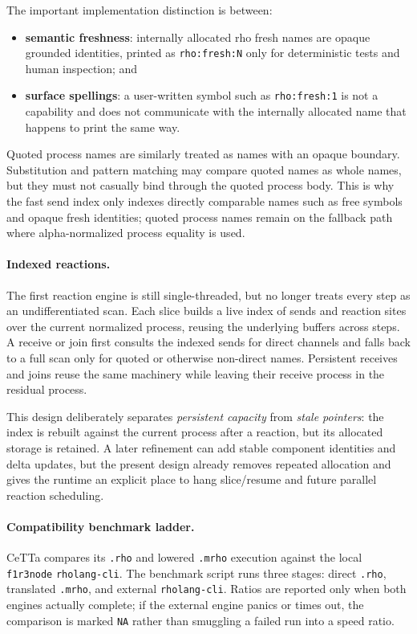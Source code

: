 \documentclass[11pt]{article}
\newcommand{\code}[1]{\texttt{#1}}
\newcommand{\CeTTa}{\textup{CeTTa}}
\begin{document}
The important implementation distinction is between:
\begin{itemize}
\item \textbf{semantic freshness}: internally allocated rho fresh names are
  opaque grounded identities, printed as \code{rho:fresh:N} only for
  deterministic tests and human inspection; and
\item \textbf{surface spellings}: a user-written symbol such as
  \code{rho:fresh:1} is not a capability and does not communicate with the
  internally allocated name that happens to print the same way.
\end{itemize}

Quoted process names are similarly treated as names with an opaque boundary.
Substitution and pattern matching may compare quoted names as whole names, but
they must not casually bind through the quoted process body.  This is why the
fast send index only indexes directly comparable names such as free symbols and
opaque fresh identities; quoted process names remain on the fallback path where
alpha-normalized process equality is used.

\paragraph{Indexed reactions.}
The first reaction engine is still single-threaded, but no longer treats every
step as an undifferentiated scan.  Each slice builds a live index of sends and
reaction sites over the current normalized process, reusing the underlying
buffers across steps.  A receive or join first consults the indexed sends for
direct channels and falls back to a full scan only for quoted or otherwise
non-direct names.  Persistent receives and joins reuse the same machinery while
leaving their receive process in the residual process.

This design deliberately separates \emph{persistent capacity} from
\emph{stale pointers}: the index is rebuilt against the current process after a
reaction, but its allocated storage is retained.  A later refinement can add
stable component identities and delta updates, but the present design already
removes repeated allocation and gives the runtime an explicit place to hang
slice/resume and future parallel reaction scheduling.

\paragraph{Compatibility benchmark ladder.}
\CeTTa{} compares its \code{.rho} and lowered \code{.mrho} execution against
the local \code{f1r3node} \code{rholang-cli}.  The benchmark script runs three
stages: direct \code{.rho}, translated \code{.mrho}, and external
\code{rholang-cli}.  Ratios are reported only when both engines actually
complete; if the external engine panics or times out, the comparison is marked
\code{NA} rather than smuggling a failed run into a speed ratio.
\end{document}
